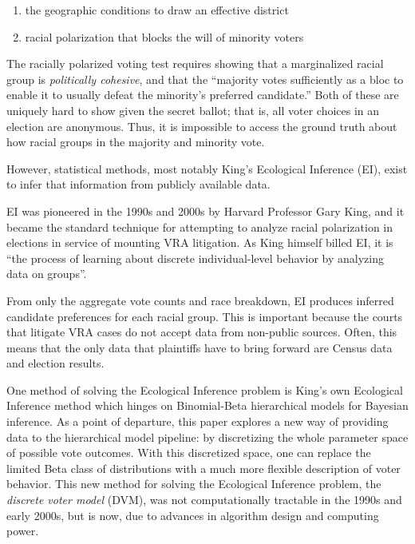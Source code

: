 \begin{enumerate}
 \item the geographic conditions to draw an effective district
 \item racial polarization that blocks the will of minority voters
\end{enumerate}

The racially polarized voting test requires showing that a marginalized racial group is \textit{politically cohesive}, and that the “majority votes sufficiently as a bloc to enable it to usually defeat the minority’s preferred candidate.” Both of these are uniquely hard to show given the secret ballot; that is, all voter choices in an election are anonymous. Thus, it is impossible to access the ground truth about how racial groups in the majority and minority vote.

However, statistical methods, most notably King’s Ecological Inference (EI)\cite{king1999}, exist to infer that information from publicly available data.

EI was pioneered in the 1990s and 2000s by Harvard Professor Gary King, and it became the standard technique for attempting to analyze racial polarization in elections in service of mounting VRA litigation. As King himself billed EI, it is “the process of learning about discrete individual-level behavior by analyzing data on groups”\cite{king1999}.

From only the aggregate vote counts and race breakdown, EI produces inferred candidate preferences for each racial group. This is important because the courts that litigate VRA cases do not accept data from non-public sources. Often, this means that the only data that plaintiffs have to bring forward are Census data and election results.

One method of solving the Ecological Inference problem is King's own Ecological Inference method which hinges on Binomial-Beta hierarchical models for Bayesian inference. As a point of departure, this paper explores a new way of providing data to the hierarchical model pipeline: by discretizing the whole parameter space of possible vote outcomes. With this discretized space, one can replace the limited Beta class of distributions with a much more flexible description of voter behavior. This new method for solving the Ecological Inference problem, the \textit{discrete voter model} (DVM), was not computationally tractable in the 1990s and early 2000s, but is now, due to advances in algorithm design and computing power.

